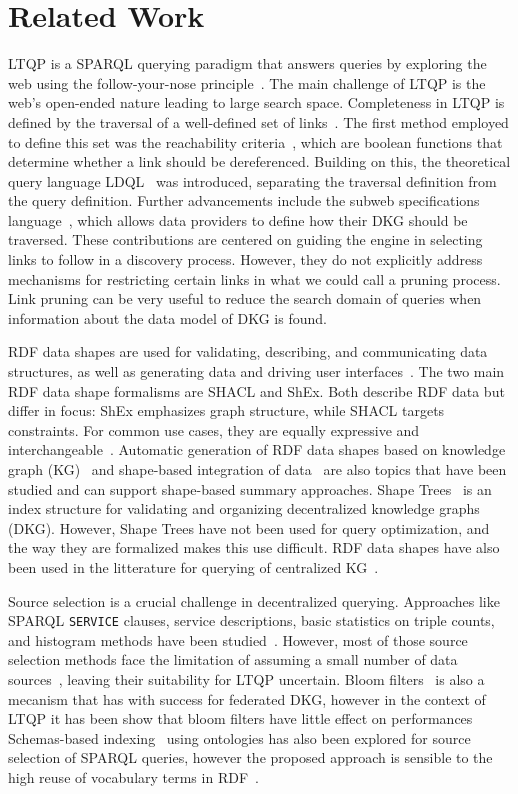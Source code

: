 \section{Related Work}

LTQP is a SPARQL querying paradigm that answers queries by exploring the web using the follow-your-nose principle~\cite{hartig2016walking}.
The main challenge of LTQP is the web's open-ended nature leading to large search space.
Completeness in LTQP is defined by the traversal of a well-defined set of links~\cite{Hartig2012}.
The first method employed to define this set was the reachability criteria~\cite{Hartig2012}, which are boolean functions that determine whether a link should be dereferenced.
Building on this, the theoretical query language LDQL~\cite{hartigLDQL} was introduced, separating the traversal definition from the query definition.
Further advancements include the subweb specifications language~\cite{Bogaerts2021LinkTW}, which allows data providers to define how their DKG should be traversed.
These contributions are centered on guiding the engine in selecting links to follow in a discovery process.
However, they do not explicitly address mechanisms for restricting certain links in what we could call a pruning process.
Link pruning can be very useful to reduce the search domain of queries when information about the data model of DKG is found.

RDF data shapes are used for validating, describing, and communicating data structures, as well as generating data and driving user interfaces~\cite{Gayo2018a,Gayo2018}.
The two main RDF data shape formalisms are SHACL and ShEx.
Both describe RDF data but differ in focus: ShEx emphasizes graph structure, while SHACL targets constraints.
For common use cases, they are equally expressive and interchangeable~\cite{Gayo2018c}.
Automatic generation of RDF data shapes based on knowledge graph (KG)~\cite{fernandez2023extracting} and shape-based integration of data~\cite{LabraGayo2023} are also topics that have been studied and can support shape-based summary approaches.
Shape Trees~\cite{shapetreesShapeTrees} is an index structure for validating and organizing decentralized knowledge graphs (DKG).
However, Shape Trees have not been used for query optimization, and the way they are formalized makes this use difficult.
RDF data shapes have also been used in the litterature for querying of centralized KG~\cite{kashif2021}.

Source selection is a crucial challenge in decentralized querying.
Approaches like SPARQL \texttt{SERVICE} clauses, service descriptions, basic statistics on triple counts, and histogram methods have been studied~\cite{hose2012towards, Harth2010}.
However, most of those source selection methods face the limitation of assuming a small number of data sources~\cite{Harth2010}, leaving their suitability for LTQP uncertain.
Bloom filters~\cite{dia2018fast} is also a mecanism that has with success for federated DKG, however in the context of LTQP it has been show that bloom filters have little effect on performances~\cite{Hanski2024}
Schemas-based indexing~\cite{Stuckenschmidt2004} using ontologies has also been explored for source selection of SPARQL queries,
however the proposed approach is sensible to the high reuse of vocabulary terms in RDF~\cite{Harth2010}.